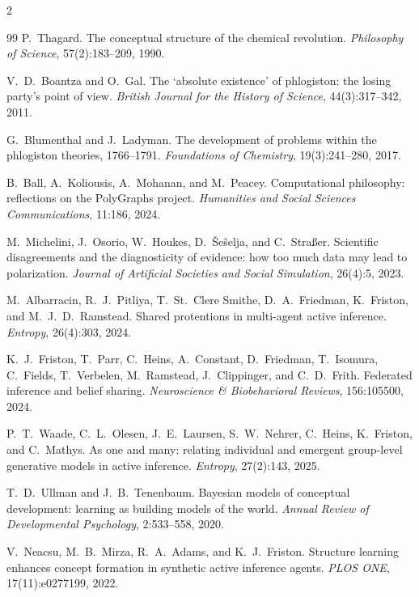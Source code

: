 \documentclass[11pt]{article}
\begin{document}
\begin{multicols}{2}
\begin{thebibliography}{99}
P.~Thagard.
The conceptual structure of the chemical revolution.
\emph{Philosophy of Science}, 57(2):183--209, 1990.

V.~D.~Boantza and O.~Gal.
The `absolute existence' of phlogiston: the losing party's point of view.
\emph{British Journal for the History of Science}, 44(3):317--342, 2011.

G.~Blumenthal and J.~Ladyman.
The development of problems within the phlogiston theories, 1766--1791.
\emph{Foundations of Chemistry}, 19(3):241--280, 2017.

B.~Ball, A.~Koliousis, A.~Mohanan, and M.~Peacey.
Computational philosophy: reflections on the {PolyGraphs} project.
\emph{Humanities and Social Sciences Communications}, 11:186, 2024.

M.~Michelini, J.~Osorio, W.~Houkes, D.~\v{S}e\v{s}elja, and C.~Stra\ss{}er.
Scientific disagreements and the diagnosticity of evidence: how too much data may lead to polarization.
\emph{Journal of Artificial Societies and Social Simulation}, 26(4):5, 2023.

M.~Albarracin, R.~J.~Pitliya, T.~St.~Clere Smithe, D.~A.~Friedman, K.~Friston, and M.~J.~D.~Ramstead.
Shared protentions in multi-agent active inference.
\emph{Entropy}, 26(4):303, 2024.

K.~J.~Friston, T.~Parr, C.~Heins, A.~Constant, D.~Friedman, T.~Isomura, C.~Fields,
T.~Verbelen, M.~Ramstead, J.~Clippinger, and C.~D.~Frith.
Federated inference and belief sharing.
\emph{Neuroscience \& Biobehavioral Reviews}, 156:105500, 2024.

P.~T.~Waade, C.~L.~Olesen, J.~E.~Laursen, S.~W.~Nehrer, C.~Heins, K.~Friston, and C.~Mathys.
As one and many: relating individual and emergent group-level generative models in active inference.
\emph{Entropy}, 27(2):143, 2025.

T.~D.~Ullman and J.~B.~Tenenbaum.
Bayesian models of conceptual development: learning as building models of the world.
\emph{Annual Review of Developmental Psychology}, 2:533--558, 2020.

V.~Neacsu, M.~B.~Mirza, R.~A.~Adams, and K.~J.~Friston.
Structure learning enhances concept formation in synthetic active inference agents.
\emph{PLOS ONE}, 17(11):e0277199, 2022.


\end{thebibliography}
\end{multicols}
\end{document}
